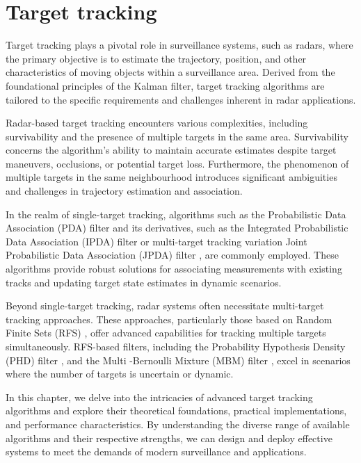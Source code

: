 
\chapter{Target tracking}
Target tracking plays a pivotal role in surveillance systems, such as radars, where the primary objective is to 
estimate the 
trajectory,
position, and other
characteristics of moving objects within a surveillance area. Derived from the foundational principles \linebreak of the Kalman filter, target tracking algorithms are tailored to the specific requirements and challenges inherent in radar applications.

Radar-based target tracking encounters various complexities, including survivability and the presence of
multiple targets in the same area. Survivability concerns the algorithm's ability to maintain
accurate estimates despite target maneuvers, occlusions, or potential target loss. Furthermore, the phenomenon of
multiple targets in the same neighbourhood introduces significant ambiguities and challenges in trajectory estimation
and
association.

In the realm of single-target tracking, algorithms such as the Probabilistic Data Association (PDA) filter \cite{BarShalomPDA} and
its
derivatives, such as the Integrated
Probabilistic Data Association (IPDA) filter \cite{brekke} or multi-target tracking variation Joint Probabilistic Data 
Association
(JPDA)
filter \cite{brekke}, are commonly
employed. These algorithms provide robust solutions for associating measurements with existing tracks and updating target state estimates in dynamic scenarios.

Beyond single-target tracking, radar systems often necessitate multi-target tracking approaches. These approaches,
particularly those based on Random Finite Sets (RFS) \cite{mahler}, offer advanced capabilities for tracking multiple targets
simultaneously. RFS-based filters, including the Probability Hypothesis Density (PHD) filter \cite{VoMaPHD2006}, and the Multi
-Bernoulli Mixture (MBM) filter \cite{GarciaPMBM2018}, excel in scenarios where the number of targets is uncertain or dynamic.

In this chapter, we delve into the intricacies of advanced target tracking algorithms and explore their theoretical
foundations, practical implementations, and performance characteristics. By understanding the diverse range of available algorithms and their respective strengths, we can design and deploy effective systems to meet the demands of modern surveillance and applications.

